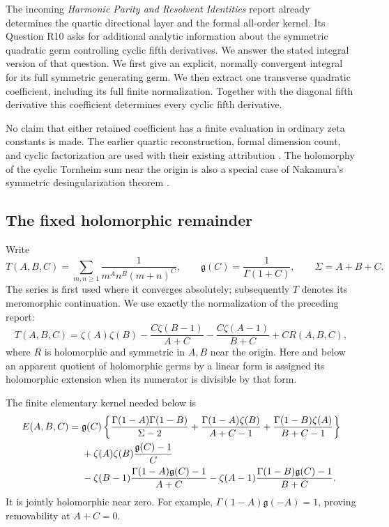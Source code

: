 \documentclass[11pt]{article}
\numberwithin{equation}{section}
\theoremstyle{plain}
\theoremstyle{definition}
\theoremstyle{remark}
\begin{document}
The incoming \emph{Harmonic Parity and Resolvent Identities} report
already determines the quartic directional layer and the formal
all-order kernel. Its Question R10 asks for additional
analytic information about the symmetric quadratic germ controlling
cyclic fifth derivatives. We answer the stated integral version of
that question. We first give an explicit, normally convergent integral
for its full symmetric generating germ. We then extract one
transverse quadratic coefficient, including its full finite
normalization. Together with the diagonal fifth derivative this
coefficient determines every cyclic fifth derivative.

No claim that either retained coefficient has a finite evaluation in
ordinary zeta constants is made. The earlier quartic reconstruction,
formal dimension count, and cyclic factorization are used with their
existing attribution \cite{bhr:Parity}. The holomorphy of the cyclic
Tornheim sum near the origin is also a special case of Nakamura's
symmetric desingularization theorem \cite[Theorem 1.2]{bhr:Nakamura}.

\subsection{The fixed holomorphic remainder}

Write
\[
 T(A,B,C)=\sum_{m,n\ge1}\frac1{m^A n^B(m+n)^C},\qquad
 \mathfrak g(C)=\frac1{\Gamma(1+C)},\qquad \Sigma=A+B+C.
\]
The series is first used where it converges absolutely; subsequently
\(T\) denotes its meromorphic continuation. We use exactly the
normalization of the preceding report:
\begin{equation}\label{bhr:fcy:R}
 T(A,B,C)=\zeta(A)\zeta(B)
 -\frac{C\zeta(B-1)}{A+C}-\frac{C\zeta(A-1)}{B+C}
 +C R(A,B,C),
\end{equation}
where \(R\) is holomorphic and symmetric in \(A,B\) near the
origin. Here and below an apparent quotient of holomorphic germs by a
linear form is assigned its holomorphic extension when its numerator
is divisible by that form.

The finite elementary kernel needed below is
\begin{align}
 E(A,B,C)={}&\mathfrak g(C)\left\{
 \frac{\Gamma(1-A)\Gamma(1-B)}{\Sigma-2}
 +\frac{\Gamma(1-A)\zeta(B)}{A+C-1}
 +\frac{\Gamma(1-B)\zeta(A)}{B+C-1}\right\}\notag\\
 &+\zeta(A)\zeta(B)\frac{\mathfrak g(C)-1}{C}\notag\\
 &-\zeta(B-1)\frac{\Gamma(1-A)\mathfrak g(C)-1}{A+C}
 -\zeta(A-1)\frac{\Gamma(1-B)\mathfrak g(C)-1}{B+C}.
 \label{bhr:fcy:E}
\end{align}
It is jointly holomorphic near zero. For example,
\(\Gamma(1-A)\mathfrak g(-A)=1\), proving removability at \(A+C=0\).
\end{document}
